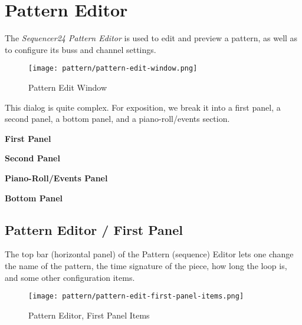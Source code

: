 %
%

\section{Pattern Editor}
\label{sec:seq24_pattern_editor}

   The \textsl{Sequencer24 Pattern Editor} is used to edit and preview a pattern,
   as well as to configure its buss and channel settings.

\begin{figure}[H]
   \centering 
   \texttt{[image: pattern/pattern-edit-window.png]}
   \caption{Pattern Edit Window}
   \label{fig:pattern_edit_window}
\end{figure}

   This dialog is quite complex.
   For exposition, we break it into a first panel, a second panel, a
   bottom panel, and a piano-roll/events section.

   \begin{enumber}
      \item \textbf{First Panel}
      \item \textbf{Second Panel}
      \item \textbf{Piano-Roll/Events Panel}
      \item \textbf{Bottom Panel}
   \end{enumber}

\subsection{Pattern Editor / First Panel}
\label{subsec:seq24_pattern_editor_first}

   The top bar (horizontal panel) of the Pattern (sequence) Editor
   lets one change the name of
   the pattern, the time signature of the piece, how long the loop is, and
   some other configuration items.

\begin{figure}[H]
   \centering 
   \texttt{[image: pattern/pattern-edit-first-panel-items.png]}
   \caption{Pattern Editor, First Panel Items}
   \label{fig:pattern_editor_first_panel_items}
\end{figure}

